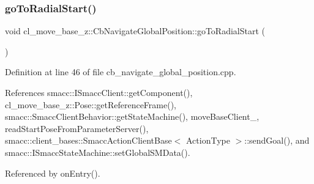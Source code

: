 \subsubsection{\texorpdfstring{go\+To\+Radial\+Start()}{goToRadialStart()}}
{\footnotesize\ttfamily void cl\+\_\+move\+\_\+base\+\_\+z\+::\+Cb\+Navigate\+Global\+Position\+::go\+To\+Radial\+Start (\begin{DoxyParamCaption}{ }\end{DoxyParamCaption})}



Definition at line 46 of file cb\+\_\+navigate\+\_\+global\+\_\+position.\+cpp.



References smacc\+::\+I\+Smacc\+Client\+::get\+Component(), cl\+\_\+move\+\_\+base\+\_\+z\+::\+Pose\+::get\+Reference\+Frame(), smacc\+::\+Smacc\+Client\+Behavior\+::get\+State\+Machine(), move\+Base\+Client\+\_\+, read\+Start\+Pose\+From\+Parameter\+Server(), smacc\+::client\+\_\+bases\+::\+Smacc\+Action\+Client\+Base$<$ Action\+Type $>$\+::send\+Goal(), and smacc\+::\+I\+Smacc\+State\+Machine\+::set\+Global\+S\+M\+Data().



Referenced by on\+Entry().


